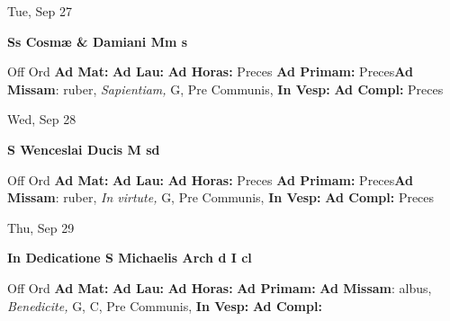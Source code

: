 \documentclass[10pt]{memoir}
\begin{document}
\begin{center}
\begin{minipage}{3.5in}
\vspace{2em}
\begin{center}Tue, Sep 27
\end{center}
\textbf{ \large Ss Cosmæ \& Damiani Mm
\textnormal{\normalsize s}}

\begin{justify}Off Ord
\textbf{Ad Mat: }
\textbf{Ad Lau: }
\textbf{Ad Horas: }Preces
\textbf{Ad Primam: }Preces\textbf{Ad Missam}: ruber, \textit{Sapientiam,} G, Pre Communis, 
\textbf{In Vesp: }
\textbf{Ad Compl: }Preces
\end{justify}
\end{minipage}
\end{center}

\begin{center}
\begin{minipage}{3.5in}
\vspace{2em}
\begin{center}Wed, Sep 28
\end{center}
\textbf{ \large S Wenceslai Ducis M
\textnormal{\normalsize sd}}

\begin{justify}Off Ord
\textbf{Ad Mat: }
\textbf{Ad Lau: }
\textbf{Ad Horas: }Preces
\textbf{Ad Primam: }Preces\textbf{Ad Missam}: ruber, \textit{In virtute,} G, Pre Communis, 
\textbf{In Vesp: }
\textbf{Ad Compl: }Preces
\end{justify}
\end{minipage}
\end{center}

\begin{center}
\begin{minipage}{3.5in}
\vspace{2em}
\begin{center}Thu, Sep 29
\end{center}
\textbf{ \large In Dedicatione S Michaelis Arch
\textnormal{\normalsize d I cl}}

\begin{justify}Off Ord
\textbf{Ad Mat: }
\textbf{Ad Lau: }
\textbf{Ad Horas: }
\textbf{Ad Primam: }\textbf{Ad Missam}: albus, \textit{Benedicite,} G, C, Pre Communis, 
\textbf{In Vesp: }
\textbf{Ad Compl: }
\end{justify}
\end{minipage}
\end{center}
\end{document}
